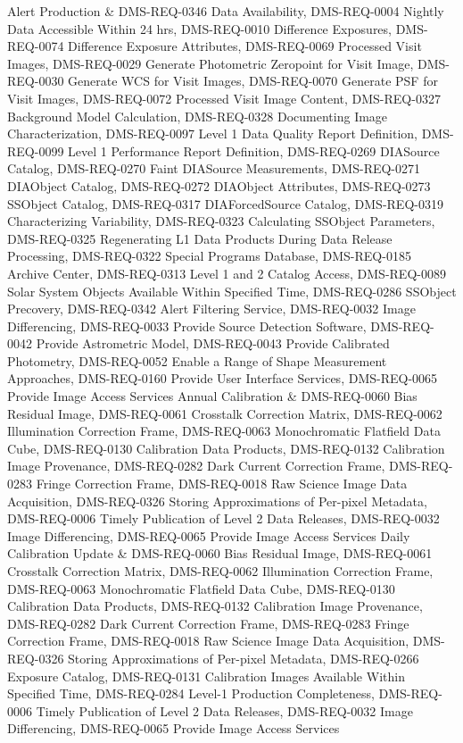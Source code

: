 Alert Production & DMS-REQ-0346 Data Availability, DMS-REQ-0004 Nightly Data Accessible Within 24 hrs, DMS-REQ-0010 Difference Exposures, DMS-REQ-0074 Difference Exposure Attributes, DMS-REQ-0069 Processed Visit Images, DMS-REQ-0029 Generate Photometric Zeropoint for Visit Image, DMS-REQ-0030 Generate WCS for Visit Images, DMS-REQ-0070 Generate PSF for Visit Images, DMS-REQ-0072 Processed Visit Image Content, DMS-REQ-0327 Background Model Calculation, DMS-REQ-0328 Documenting Image Characterization, DMS-REQ-0097 Level 1 Data Quality Report Definition, DMS-REQ-0099 Level 1 Performance Report Definition, DMS-REQ-0269 DIASource Catalog, DMS-REQ-0270 Faint DIASource Measurements, DMS-REQ-0271 DIAObject Catalog, DMS-REQ-0272 DIAObject Attributes, DMS-REQ-0273 SSObject Catalog, DMS-REQ-0317 DIAForcedSource Catalog, DMS-REQ-0319 Characterizing Variability, DMS-REQ-0323 Calculating SSObject Parameters, DMS-REQ-0325 Regenerating L1 Data Products During Data Release Processing, DMS-REQ-0322 Special Programs Database, DMS-REQ-0185 Archive Center, DMS-REQ-0313 Level 1 and 2 Catalog Access, DMS-REQ-0089 Solar System Objects Available Within Specified Time, DMS-REQ-0286 SSObject Precovery, DMS-REQ-0342 Alert Filtering Service, DMS-REQ-0032 Image Differencing, DMS-REQ-0033 Provide Source Detection Software, DMS-REQ-0042 Provide Astrometric Model, DMS-REQ-0043 Provide Calibrated Photometry, DMS-REQ-0052 Enable a Range of Shape Measurement Approaches, DMS-REQ-0160 Provide User Interface Services, DMS-REQ-0065 Provide Image Access Services
Annual Calibration & DMS-REQ-0060 Bias Residual Image, DMS-REQ-0061 Crosstalk Correction Matrix, DMS-REQ-0062 Illumination Correction Frame, DMS-REQ-0063 Monochromatic Flatfield Data Cube, DMS-REQ-0130 Calibration Data Products, DMS-REQ-0132 Calibration Image Provenance, DMS-REQ-0282 Dark Current Correction Frame, DMS-REQ-0283 Fringe Correction Frame, DMS-REQ-0018 Raw Science Image Data Acquisition, DMS-REQ-0326 Storing Approximations of Per-pixel Metadata, DMS-REQ-0006 Timely Publication of Level 2 Data Releases, DMS-REQ-0032 Image Differencing, DMS-REQ-0065 Provide Image Access Services
Daily Calibration Update & DMS-REQ-0060 Bias Residual Image, DMS-REQ-0061 Crosstalk Correction Matrix, DMS-REQ-0062 Illumination Correction Frame, DMS-REQ-0063 Monochromatic Flatfield Data Cube, DMS-REQ-0130 Calibration Data Products, DMS-REQ-0132 Calibration Image Provenance, DMS-REQ-0282 Dark Current Correction Frame, DMS-REQ-0283 Fringe Correction Frame, DMS-REQ-0018 Raw Science Image Data Acquisition, DMS-REQ-0326 Storing Approximations of Per-pixel Metadata, DMS-REQ-0266 Exposure Catalog, DMS-REQ-0131 Calibration Images Available Within Specified Time, DMS-REQ-0284 Level-1 Production Completeness, DMS-REQ-0006 Timely Publication of Level 2 Data Releases, DMS-REQ-0032 Image Differencing, DMS-REQ-0065 Provide Image Access Services
